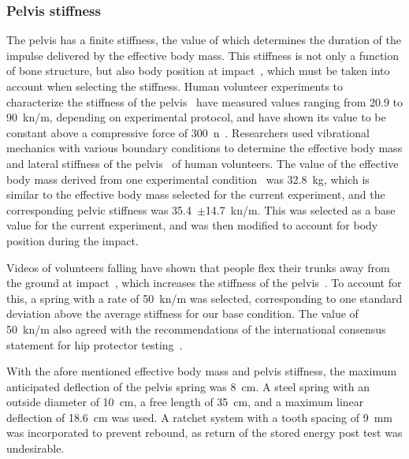 		\subsubsection{Pelvis stiffness}
		\label{sec:fall_sim_design_methods_apparatus_stiff}
		The pelvis has a finite stiffness, the value of which determines the duration of the impulse delivered by the effective body mass.
		This stiffness is not only a function of bone structure, but also body position at impact~\citep{robinovitch_distribution_1997, van_den_kroonenberg_hip_1996}, which must be taken into account when selecting the stiffness.
		Human volunteer experiments to characterize the stiffness of the pelvis~\citep{robinovitch_prediction_1991, robinovitch_distribution_1997, laing_characterizing_2010} have measured values ranging from 20.9 to 90~\ac{kn}/\ac{m}, depending on experimental protocol, and have shown its value to be constant above a compressive force of 300~\ac{n}~\citep{robinovitch_prediction_1991, laing_characterizing_2010}.
		Researchers used vibrational mechanics with various boundary conditions to determine the effective body mass and lateral stiffness of the pelvis~\citep{robinovitch_distribution_1997,laing_characterizing_2010} of human volunteers.
		The value of the effective body mass derived from one experimental condition~\citep{robinovitch_distribution_1997} was 32.8~\ac{kg}, which is similar to the effective body mass selected for the current experiment, and the corresponding pelvic stiffness was 35.4~$\pm$14.7~\ac{kn}/\ac{m}.
		This was selected as a base value for the current experiment, and was then modified to account for body position during the impact.
		
		Videos of volunteers falling have shown that people flex their trunks away from the ground at impact~\citep{van_den_kroonenberg_hip_1996, feldman_reducing_2007}, which increases the stiffness of the pelvis~\citep{robinovitch_distribution_1997}.
		To account for this, a spring with a rate of 50~\ac{kn}/\ac{m} was selected, corresponding to one standard deviation above the average stiffness for our base condition.
		The value of 50~\ac{kn}/\ac{m} also agreed with the recommendations of the international consensus statement for hip protector testing~\citep{robinovitch_hip_2009}.
		
		With the afore mentioned effective body mass and pelvis stiffness, the maximum anticipated deflection of the pelvis spring was 8~\ac{cm}.
		A steel spring with an outside diameter of 10~\ac{cm}, a free length of 35~\ac{cm}, and a maximum linear deflection of 18.6~\ac{cm} was used.
		A ratchet system with a tooth spacing of 9~\ac{mm} was incorporated to prevent rebound, as return of the stored energy post test was undesirable.

